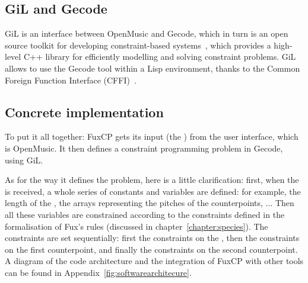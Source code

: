 \subsection{GiL and Gecode}
GiL is an interface between OpenMusic and Gecode, which in turn is an open source toolkit for developing constraint-based systems~\cite{Gecode}, which provides a high-level C++ library for efficiently modelling and solving constraint problems. GiL allows to use the Gecode tool within a Lisp environment, thanks to the Common Foreign Function Interface (CFFI)~\cite{CFFI}.

\subsection{Concrete implementation}
To put it all together: FuxCP gets its input (the \cf) from the user interface, which is OpenMusic. It then defines a constraint programming problem in Gecode, using GiL. 

As for the way it defines the problem, here is a little clarification: first, when the \cfs is received, a whole series of constants and variables are defined: for example, the length of the \cf, the arrays representing the pitches of the counterpoints, ...
Then all these variables are constrained according to the constraints defined in the formalisation of Fux's rules (discussed in chapter~\ref{chapter:species}). The constraints are set sequentially: first the constraints on the \cf, then the constraints on the first counterpoint, and finally the constraints on the second counterpoint. A diagram of the code architecture and the integration of FuxCP with other tools can be found in Appendix~\ref{fig:softwarearchitecure}.






